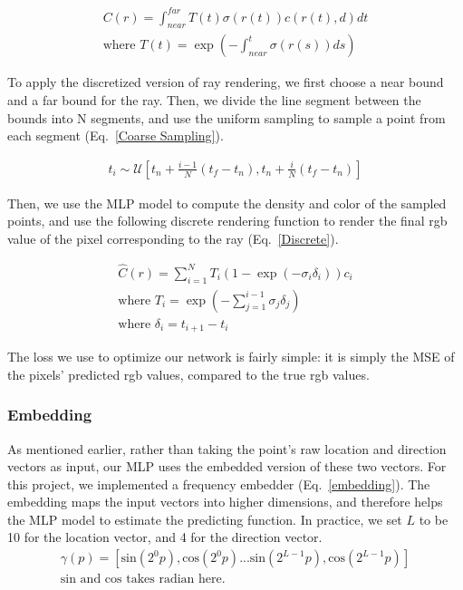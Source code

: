 \begin{equation}
\begin{aligned}
C(r) = \int_{near}^{far} T(t) \sigma(r(t))c(r(t), d)dt \\ \text{where } T(t) = \exp{(-\int_{near}^{t} \sigma(r(s))ds)}
\end{aligned}
\label{Rendering}
\end{equation}

To apply the discretized version of ray rendering, we first choose a near bound and a far bound for the ray. Then, we divide the line segment between the bounds into N segments, and use the uniform sampling to sample a point from each segment (Eq.~\ref{Coarse Sampling}).

\begin{equation}
\begin{aligned}
t_i  \sim  \mathcal{U}[t_n+\frac{i-1}{N}(t_f-t_n),t_n+\frac{i}{N}(t_f-t_n)]
\end{aligned}
\label{Coarse Sampling}
\end{equation}

Then, we use the MLP model to compute the density and color of the sampled points, and use the following discrete rendering function to render the final rgb value of the pixel corresponding to the ray (Eq.~\ref{Discrete}). 

\begin{equation}
\begin{aligned}
\hat{C}(r) = \sum_{i=1}^{N} T_i (1-\exp{(-\sigma_i \delta_i)})c_i \\ \text{where } T_i = \exp{(-\sum_{j=1}^{i-1} \sigma_j \delta_j)} \\ \text{where } \delta_i=t_{i+1}-t_i
\end{aligned}
\label{Discrete}
\end{equation}

The loss we use to optimize our network is fairly simple: it is simply the MSE of the pixels' predicted rgb values, compared to the true rgb values.

\subsubsection{Embedding}
As mentioned earlier, rather than taking the point's raw location and direction vectors as input, our MLP uses the embedded version of these two vectors. For this project, we implemented a frequency embedder (Eq.~\ref{embedding}). The embedding maps the input vectors into higher dimensions, and therefore helps the MLP model to estimate the predicting function. In practice, we set $L$ to be 10 for the location vector, and 4 for the direction vector.
\begin{equation}
\begin{aligned}
\gamma(p) = [\text{sin}(2^0 p),\text{cos}(2^0 p) ... \text{sin}(2^{L-1} p),\text{cos}(2^{L-1} p)  ] \\ \text{sin and cos takes radian here.}
\end{aligned}
\label{embedding}
\end{equation}

